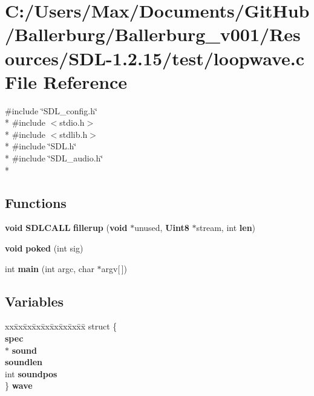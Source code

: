 \section{C\+:/\+Users/\+Max/\+Documents/\+Git\+Hub/\+Ballerburg/\+Ballerburg\+\_\+v001/\+Resources/\+S\+D\+L-\/1.2.15/test/loopwave.c File Reference}
\label{loopwave_8c}
{\ttfamily \#include \char`\"{}S\+D\+L\+\_\+config.\+h\char`\"{}}\\*
{\ttfamily \#include $<$stdio.\+h$>$}\\*
{\ttfamily \#include $<$stdlib.\+h$>$}\\*
{\ttfamily \#include \char`\"{}S\+D\+L.\+h\char`\"{}}\\*
{\ttfamily \#include \char`\"{}S\+D\+L\+\_\+audio.\+h\char`\"{}}\\*
\subsection*{Functions}
\begin{DoxyCompactItemize}
\item 
{\bf void} {\bf S\+D\+L\+C\+A\+L\+L} {\bf fillerup} ({\bf void} $\ast$unused, {\bf Uint8} $\ast$stream, int {\bf len})
\item 
{\bf void} {\bf poked} (int sig)
\item 
int {\bf main} (int argc, char $\ast$argv[$\,$])
\end{DoxyCompactItemize}
\subsection*{Variables}
\begin{DoxyCompactItemize}
\item 
\begin{tabbing}
xx\=xx\=xx\=xx\=xx\=xx\=xx\=xx\=xx\=\kill
struct \{\\
 {\bf spec}\\
 $\ast$ {\bf sound}\\
 {\bf soundlen}\\
\>int {\bf soundpos}\\
\} {\bf wave}\\

\end{tabbing}\end{DoxyCompactItemize}


